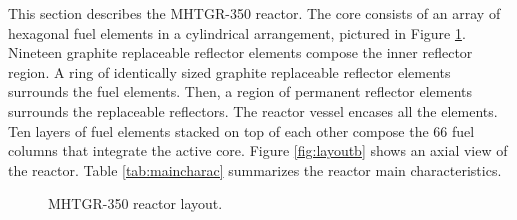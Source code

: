 This section describes the \gls{MHTGR}-350 reactor.
The core consists of an array of hexagonal fuel elements in a cylindrical arrangement, pictured in Figure \ref{fig:layout}.
Nineteen graphite replaceable reflector elements compose the inner reflector region.
A ring of identically sized graphite replaceable reflector elements surrounds the fuel elements.
Then, a region of permanent reflector elements surrounds the replaceable reflectors.
The reactor vessel encases all the elements.
Ten layers of fuel elements stacked on top of each other compose the 66 fuel columns that integrate the active core.
Figure \ref{fig:layoutb} shows an axial view of the reactor.
Table \ref{tab:maincharac} summarizes the reactor main characteristics.

\begin{figure}[htbp!]
    \centering
    \hfill
    \caption{MHTGR-350 reactor layout.}
    \label{fig:layout}
\end{figure}

